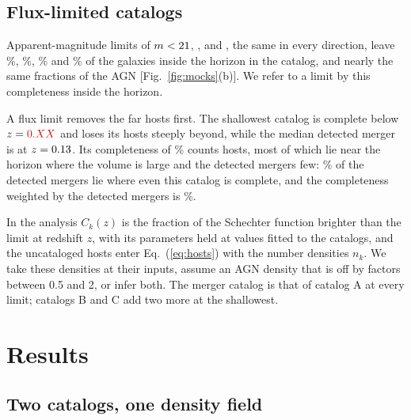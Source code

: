 \documentclass[aps,prd,reprint,twocolumn,superscriptaddress,nofootinbib,floatfix]{revtex4-2}
\providecommand{\MockzCompleteEighteen}{\ph{0.XX}}     %
\providecommand{\MockEventFracCompleteEighteen}{\ph{XX}} %
\providecommand{\MockEventCompEighteen}{\ph{XX}}       %
\newcommand{\req}[1]{#1}
\providecommand{\DensityFactorLo}{\req{0.5}}
\providecommand{\DensityFactorHi}{\req{2}}
\begin{document}
\subsection{Flux-limited catalogs}
\label{sec:fluxcats}

Apparent-magnitude limits of $m<21$, \MockMlimTwenty,
\MockMlimNineteen{} and \MockMlimEighteen, the same in every direction, leave
\MockCompTwentyOne\%, \MockCompTwenty\%, \MockCompNineteen\% and
\MockCompEighteen\% of the galaxies inside the horizon in the catalog, and
nearly the same fractions of the AGN [Fig.~\ref{fig:mocks}(b)]. We refer to
a limit by this completeness inside the horizon.

A flux limit removes the far hosts first. The shallowest catalog is complete
below $z=\MockzCompleteEighteen$ and loses its hosts steeply beyond, while
the median detected merger is at $z=0.13$. Its completeness of
\MockCompEighteen\% counts hosts, most of which lie near the horizon where
the volume is large and the detected mergers few: \MockEventFracCompleteEighteen\%
of the detected mergers lie where even this catalog is complete, and the
completeness weighted by the detected mergers is \MockEventCompEighteen\%.

In the analysis $C_k(z)$ is the fraction of the Schechter function brighter
than the limit at redshift $z$, with its parameters held at values fitted to
the catalogs, and the uncataloged hosts enter Eq.~(\ref{eq:hosts}) with the
number densities $n_k$. We take these densities at their inputs, assume an
AGN density that is off by factors between \DensityFactorLo{} and
\DensityFactorHi, or infer both. The merger catalog is that of catalog A at every limit; catalogs
B and C add two more at the shallowest.

\section{Results}
\label{sec:results}

\subsection{Two catalogs, one density field}
\label{sec:two}
\end{document}
